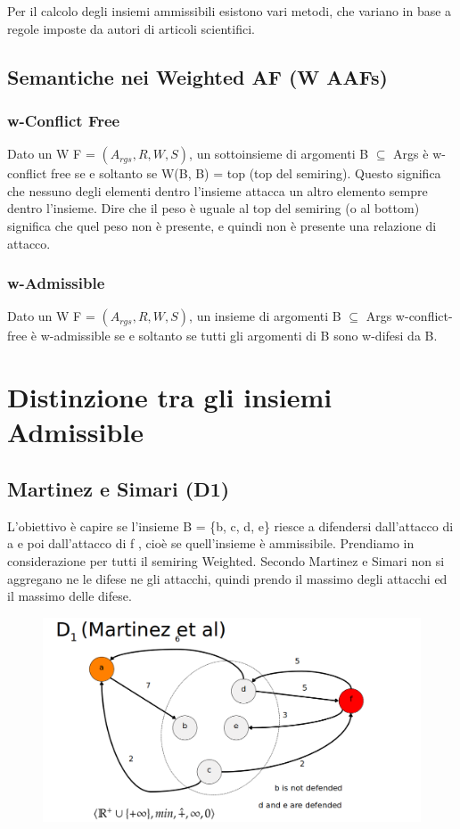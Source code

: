     Per il calcolo degli insiemi ammissibili esistono vari metodi, che variano in base a regole imposte da autori di articoli scientifici.

    \subsection{Semantiche nei Weighted AF (W AAFs)}
    \subsubsection{w-Conflict Free}
    Dato un W F = $(A_{rgs} , R, W, S)$, un sottoinsieme di argomenti B $\subseteq$ Args è w-conflict free se e soltanto se W(B, B) = top (top del semiring). Questo significa che nessuno degli elementi dentro l'insieme attacca un altro elemento sempre dentro l'insieme. Dire che il peso è uguale al top del semiring (o al bottom) significa che quel peso non è presente, e quindi non è presente una relazione di attacco.
    \subsubsection{w-Admissible}
    Dato un W F = $(A_{rgs} , R, W, S)$, un insieme di argomenti B $\subseteq$ Args w-conflict-free è w-admissible se e soltanto se tutti gli argomenti di B sono w-difesi da B.
    \section{Distinzione tra gli insiemi Admissible}
    \subsection{Martinez e Simari (D1)}
    L'obiettivo è capire se l'insieme B = \{b, c, d, e\} riesce a difendersi dall'attacco di a e poi dall'attacco di f , cioè se quell'insieme è ammissibile. Prendiamo in considerazione per tutti il semiring Weighted. Secondo Martinez e Simari non si aggregano ne le difese ne gli attacchi, quindi prendo il massimo degli attacchi ed il massimo delle difese.
    \begin{figure}[H]
        \centering
        \includegraphics[width=13cm, keepaspectratio]{img/Cap6/martinez2.png}

    \end{figure}

